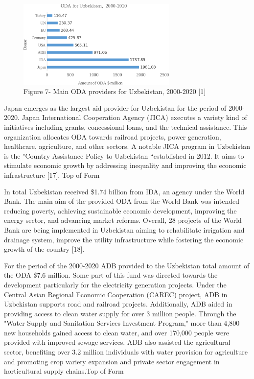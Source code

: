 \begin{figure}[H]
	\centering
	\includegraphics[width=0.7\textwidth]{assets/341.6}
	\caption*{Figure 7- Main ODA providers for Uzbekistan, 2000-2020 {[}1{]}}
\end{figure}

\begin{multicols}{2}
Japan emerges as the largest aid provider for Uzbekistan for the period
of 2000-2020. Japan International Cooperation Agency (JICA) executes a
variety kind of initiatives including grants, concessional loans, and
the technical assistance. This organization allocates ODA towards
railroad projects, power generation, healthcare, agriculture, and other
sectors. A notable JICA program in Uzbekistan is the "Country Assistance
Policy to Uzbekistan ``established in 2012. It aims to stimulate
economic growth by addressing inequality and improving the economic
infrastructure {[}17{]}. Top of Form

In total Uzbekistan received \$1.74 billion from IDA, an agency under
the World Bank. The main aim of the provided ODA from the World Bank was
intended reducing poverty, achieving sustainable economic development,
improving the energy sector, and advancing market reforms. Overall, 28
projects of the World Bank are being implemented in Uzbekistan aiming to
rehabilitate irrigation and drainage system, improve the utility
infrastructure while fostering the economic growth of the country
{[}18{]}.

For the period of the 2000-2020 ADB provided to the Uzbekistan total
amount of the ODA \$7.6 million. Some part of this fund was directed
towards the development particularly for the electricity generation
projects. Under the Central Asian Regional Economic Cooperation (CAREC)
project, ADB in Uzbekistan supports road and railroad projects.
Additionally, ADB aided in providing access to clean water supply for
over 3 million people. Through the "Water Supply and Sanitation Services
Investment Program," more than 4,800 new households gained access to
clean water, and over 170,000 people were provided with improved sewage
services. ADB also assisted the agricultural sector, benefiting over 3.2
million individuals with water provision for agriculture and promoting
crop variety expansion and private sector engagement in horticultural
supply chains.Top of Form


\end{multicols}
